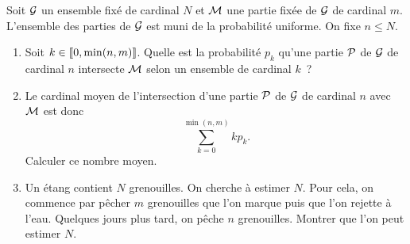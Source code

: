 \documentclass{magnolia}
\begin{document}





Soit ${\cal G}$ un ensemble fixé de cardinal $N$ et ${\cal M}$ une partie fixée de ${\cal G}$ de cardinal $m$. L'ensemble des parties de ${\cal G}$ est muni de la probabilité uniforme. On fixe $n \leq N$.
\begin{enumerate}
\item Soit $k \in \left\llbracket 0,\min(n, m)\right\rrbracket$. Quelle est la probabilité $p_k$ qu'une partie ${\cal P}$ de ${\cal G}$ de cardinal $n$ intersecte ${\cal M}$ selon un ensemble de cardinal $k$~?
\item Le cardinal moyen de l'intersection d'une partie ${\cal P}$ de ${\cal G}$ de cardinal $n$ avec ${\cal M}$ est donc \[\sum\limits_{k=0}^{\min(n,m)} k p_k.\] Calculer ce nombre moyen.
\item Un étang contient $N$ grenouilles. On cherche à estimer $N$. Pour cela, on commence par pêcher $m$ grenouilles que l'on marque puis que l'on rejette à l'eau. Quelques jours plus tard, on pêche $n$ grenouilles. Montrer que l'on peut estimer $N$.
\end{enumerate}
\end{document}
